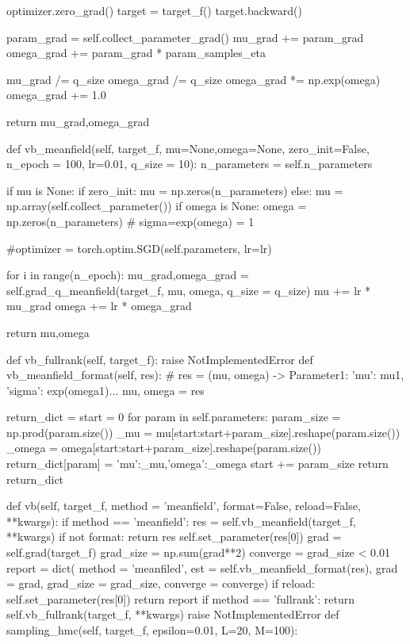 \documentclass{sicnuthesis}
\begin{document}
\begin{python}
            optimizer.zero_grad()
            target = target_f()
            target.backward()
            
            param_grad = self.collect_parameter_grad()
            mu_grad += param_grad
            omega_grad += param_grad * param_samples_eta
        
        mu_grad /= q_size
        omega_grad /= q_size
        omega_grad *= np.exp(omega)
        omega_grad += 1.0
        
        return mu_grad,omega_grad
            
    def vb_meanfield(self, target_f, mu=None,omega=None, zero_init=False, 
                     n_epoch = 100, lr=0.01, q_size = 10):
        n_parameters = self.n_parameters
        
        if mu is None:
            if zero_init:
                mu = np.zeros(n_parameters)
            else:
                mu = np.array(self.collect_parameter())
        if omega is None:
            omega = np.zeros(n_parameters) # sigma=exp(omega) = 1
        
        #optimizer = torch.optim.SGD(self.parameters, lr=lr)
        
        for i in range(n_epoch):
            mu_grad,omega_grad = self.grad_q_meanfield(target_f, mu, omega, q_size = q_size)
            mu += lr * mu_grad
            omega += lr * omega_grad
        
        return mu,omega
        
        
    def vb_fullrank(self, target_f):
        raise NotImplementedError
    def vb_meanfield_format(self, res):
        # res = (mu, omega) -> {Parameter1: {'mu': mu1, 'sigma': exp(omega1)}...}
        mu, omega = res
        
        return_dict = {}
        start = 0
        for param in self.parameters:
            param_size = np.prod(param.size())
            _mu = mu[start:start+param_size].reshape(param.size())
            _omega = omega[start:start+param_size].reshape(param.size())
            return_dict[param] = {'mu':_mu,'omega':_omega}
            start += param_size
        return return_dict

    def vb(self, target_f, method = 'meanfield', format=False, 
                 reload=False, **kwargs):
        if method == 'meanfield':
            res = self.vb_meanfield(target_f, **kwargs)
            if not format:
                return res
            self.set_parameter(res[0])
            grad = self.grad(target_f) 
            grad_size = np.sum(grad**2)
            converge = grad_size < 0.01
            report = dict( method = 'meanfiled', 
                           est = self.vb_meanfield_format(res),
                           grad = grad,
                           grad_size = grad_size,
                           converge = converge)
            if reload:
                self.set_parameter(res[0])
            return report
        if method == 'fullrank':
            return self.vb_fullrank(target_f, **kwargs)
        raise NotImplementedError
    def sampling_hmc(self, target_f, epsilon=0.01, L=20, M=100):
        

\end{python}
\end{document}
